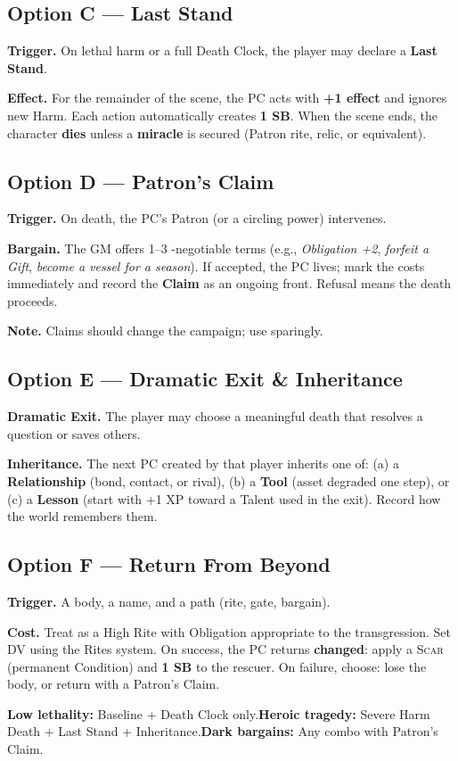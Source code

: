 \subsection*{Option C — Last Stand}\label{subsec:last-stand}
\textbf{Trigger.} On lethal harm or a full Death Clock, the player may declare a \textbf{Last Stand}.\par
\textbf{Effect.} For the remainder of the scene, the PC acts with \textbf{+1 effect} and ignores new Harm. Each action automatically creates \textbf{1 SB}. When the scene ends, the character \textbf{dies} unless a \textbf{miracle} is secured (Patron rite, relic, or equivalent).

\subsection*{Option D — Patron's Claim}\label{subsec:patron-claim}
\textbf{Trigger.} On death, the PC's Patron (or a circling power) intervenes.\par
\textbf{Bargain.} The GM offers 1–3 \non-negotiable terms (e.g., \emph{Obligation +2}, \emph{forfeit a Gift}, \emph{become a vessel for a season}). If accepted, the PC lives; mark the costs immediately and record the \textbf{Claim} as an ongoing front. Refusal means the death proceeds.\par
\textbf{Note.} Claims should change the campaign; use sparingly.

\subsection*{Option E — Dramatic Exit & Inheritance}\label{subsec:inheritance}
\textbf{Dramatic Exit.} The player may choose a meaningful death that resolves a question or saves others.\par
\textbf{Inheritance.} The next PC created by that player inherits one of: (a) a \textbf{Relationship} (bond, contact, or rival), (b) a \textbf{Tool} (asset degraded one step), or (c) a \textbf{Lesson} (start with +1 XP toward a Talent used in the exit). Record how the world remembers them.

\subsection*{Option F — Return From Beyond}\label{subsec:return}
\textbf{Trigger.} A body, a name, and a path (rite, gate, bargain).\par
\textbf{Cost.} Treat as a High Rite with Obligation appropriate to the transgression. Set DV using the Rites system. On success, the PC returns \textbf{changed}: apply a \textsc{Scar} (permanent Condition) and \textbf{1 SB} to the rescuer. On failure, choose: lose the body, or return with a Patron's Claim.
\begin{tcolorbox}[title={Quick Picks},colback=gray!5,colframe=black]
\small \textbf{Low lethality:} Baseline + Death Clock only.\quad \textbf{Heroic tragedy:} Severe Harm Death + Last Stand + Inheritance.\quad \textbf{Dark bargains:} Any combo with Patron’s Claim.\end{tcolorbox}

